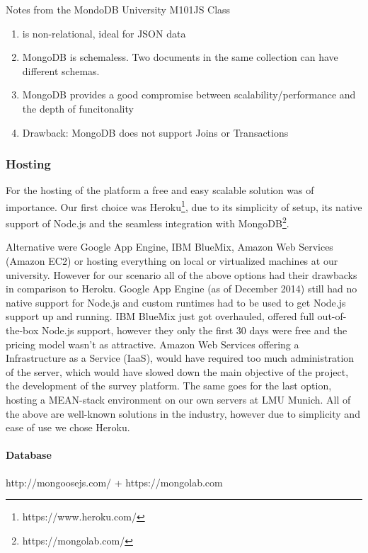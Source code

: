 Notes from the MondoDB University M101JS Class
\begin{enumerate}
\item is non-relational, ideal for JSON data
\item MongoDB is schemaless. Two documents in the same collection can have different schemas.
\item MongoDB provides a good compromise between scalability/performance and the depth of funcitonality
\item Drawback: MongoDB does not support Joins or Transactions
\end{enumerate}



\subsubsection{Hosting}

For the hosting of the platform a free and easy scalable solution was of importance. Our first choice was Heroku\footnote{https://www.heroku.com/}, due to its simplicity of setup, its native support of Node.js and the seamless integration with MongoDB\footnote{https://mongolab.com/}.





Alternative were Google App Engine, IBM BlueMix, Amazon Web Services (Amazon EC2) or hosting everything on local or virtualized machines at our university. However for our scenario all of the above options had their drawbacks in comparison to Heroku. Google App Engine (as of December 2014) still had no native support for Node.js and custom runtimes had to be used to get Node.js support up and running. IBM BlueMix just got overhauled, offered full out-of-the-box Node.js support, however they only the first 30 days were free and the pricing model wasn't as attractive. Amazon Web Services offering a Infrastructure as a Service (IaaS), would have required too much administration of the server, which would have slowed down the main objective of the project, the development of the survey platform. The same goes for the last option, hosting a MEAN-stack environment on our own servers at LMU Munich. All of the above are well-known solutions in the industry, however due to simplicity and ease of use we chose Heroku.



\paragraph{Database}

http://mongoosejs.com/ + https://mongolab.com
